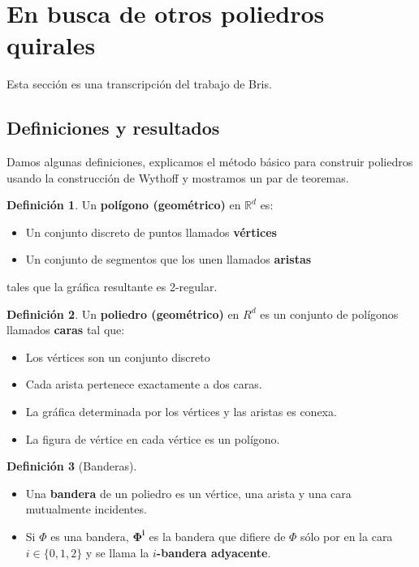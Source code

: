 \documentclass[spanish]{article}
\theoremstyle{definition}
\newtheorem*{defn}{Definición}
\newcommand{\R}{\mathbb{R}}
\begin{document}
\section{En busca de otros poliedros quirales}
Esta sección es una transcripción del trabajo de Bris.

\subsection{Definiciones y resultados}
Damos algunas definiciones, explicamos el método básico para construir poliedros usando la construcción de Wythoff y mostramos un par de teoremas.

\begin{defn}
	Un \textbf{polígono (geométrico)} en $\R^d$ es:
	\begin{itemize}
		\item Un conjunto discreto de puntos llamados \textbf{vértices}
		\item Un conjunto de segmentos que los unen llamados \textbf{aristas}
	\end{itemize}
	tales que la gráfica resultante es 2-regular.
\end{defn}

\begin{defn}
	Un \textbf{poliedro (geométrico)} en $R^d$ es un conjunto de polígonos llamados \textbf{caras} tal que:
	\begin{itemize}
		\item Los vértices son un conjunto discreto
		\item Cada arista pertenece exactamente a dos caras.
		\item La gráfica determinada por los vértices y las aristas es conexa.
		\item La figura de vértice en cada vértice es un polígono.
	\end{itemize}
\end{defn}

\begin{defn}[Banderas]
	\begin{itemize}
		\item 	Una \textbf{bandera} de un poliedro es un vértice, una arista y una cara mutualmente incidentes.
		\item Si $\Phi$ es una bandera, $\mathbf{\Phi^i}$ es la bandera que difiere de $\Phi$ sólo por en la cara $i\in\{0,1,2\}$ y se llama la $i$\textbf{-bandera adyacente}.
	\end{itemize}
\end{defn}
\end{document}
